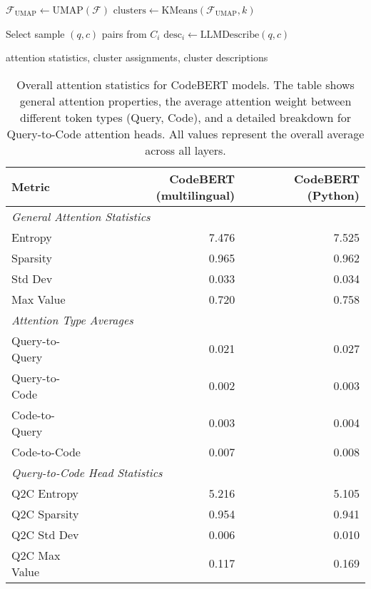 \documentclass[conference]{IEEEtran}
\begin{document}
\begin{algorithm}[htbp]
\begin{algorithmic}
    \State $\mathcal{F}_{\text{UMAP}} \gets \text{UMAP}(\mathcal{F})$
    \State $\text{clusters} \gets \text{KMeans}(\mathcal{F}_{\text{UMAP}}, k)$

        \State Select sample $(q, c)$ pairs from $C_i$
        \State $\text{desc}_i \gets \text{LLMDescribe}(q, c)$ 
    \EndFor

    \State \Return attention statistics, cluster assignments, cluster descriptions
\EndProcedure
\end{algorithmic}
\end{algorithm}


\begin{table*}[!t]
\centering
\caption{Overall attention statistics for CodeBERT models. The table shows general attention properties, the average attention weight between different token types (Query, Code), and a detailed breakdown for Query-to-Code attention heads. All values represent the overall average across all layers.}
\label{tab:attention_stats}
\begin{tabular}{lrr}
\toprule
\textbf{Metric} & \textbf{CodeBERT (multilingual)} & \textbf{CodeBERT (Python)} \\
\midrule
\multicolumn{3}{l}{\textit{General Attention Statistics}} \\
\quad Entropy            & 7.476  & 7.525 \\
\quad Sparsity           & 0.965  & 0.962 \\
\quad Std Dev            & 0.033  & 0.034 \\
\quad Max Value          & 0.720  & 0.758 \\
\midrule
\multicolumn{3}{l}{\textit{Attention Type Averages}} \\
\quad Query-to-Query     & 0.021  & 0.027 \\
\quad Query-to-Code      & 0.002  & 0.003 \\
\quad Code-to-Query      & 0.003  & 0.004 \\
\quad Code-to-Code       & 0.007  & 0.008 \\
\midrule
\multicolumn{3}{l}{\textit{Query-to-Code Head Statistics}} \\
\quad Q2C Entropy        & 5.216  & 5.105 \\
\quad Q2C Sparsity       & 0.954  & 0.941 \\
\quad Q2C Std Dev        & 0.006  & 0.010 \\
\quad Q2C Max Value      & 0.117  & 0.169 \\
\bottomrule
\end{tabular}
\end{table*}
\end{document}

